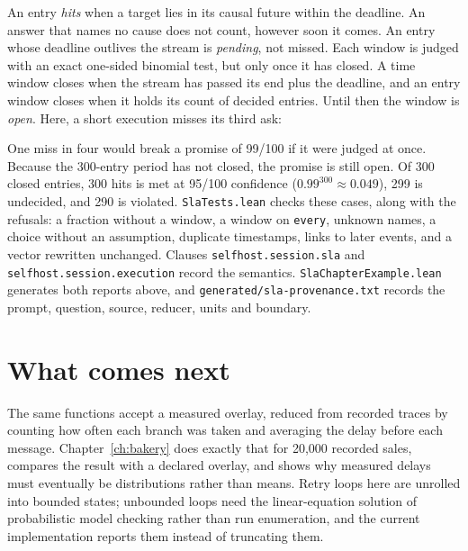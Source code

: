 An entry \emph{hits} when a target lies in its causal future within the
deadline. An answer that names no cause does not count, however soon it comes.
An entry whose deadline outlives the stream is \emph{pending}, not missed. Each
window is judged with an exact one-sided binomial test, but only once it has
closed. A time window closes when the stream has passed its end plus the
deadline, and an entry window closes when it holds its count of decided
entries. Until then the window is \emph{open}. Here, a short execution misses
its third ask:



One miss in four would break a promise of 99/100 if it were judged at once.
Because the 300-entry period has not closed, the promise is still open. Of 300
closed entries, 300 hits is met at 95/100 confidence ($0.99^{300} \approx
0.049$), 299 is undecided, and 290 is violated. \texttt{SlaTests.lean} checks
these cases, along with the refusals: a fraction without a window, a window on
\texttt{every}, unknown names, a choice without an assumption, duplicate
timestamps, links to later events, and a vector rewritten unchanged. Clauses
\texttt{selfhost.session.sla} and \texttt{selfhost.session.execution} record
the semantics. \texttt{SlaChapterExample.lean} generates both reports above,
and \texttt{generated/sla-provenance.txt} records the prompt, question, source,
reducer, units and boundary.

\section{What comes next}

The same functions accept a measured overlay, reduced from recorded traces by
counting how often each branch was taken and averaging the delay before each
message. Chapter~\ref{ch:bakery} does exactly that for 20{,}000 recorded
sales, compares the result with a declared overlay, and shows why measured
delays must eventually be distributions rather than means. Retry loops here are
unrolled into bounded states; unbounded loops need the linear-equation
solution of probabilistic model checking rather than run enumeration, and the
current implementation reports them instead of truncating them.
